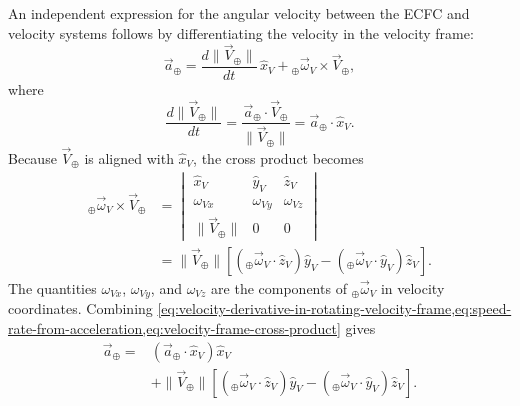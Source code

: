 An independent expression for the angular velocity between the ECFC and velocity
systems follows by differentiating the velocity in the velocity frame:
\begin{equation}
  \vec a_{\oplus}
  =\frac{d\lVert\vec V_{\oplus}\rVert}{dt}\,\hat x_V
   +{}_{\oplus}\vec\omega_V\times\vec V_{\oplus},
  \label{eq:velocity-derivative-in-rotating-velocity-frame}
\end{equation}
where
\begin{equation}
  \frac{d\lVert\vec V_{\oplus}\rVert}{dt}
  =\frac{\vec a_{\oplus}\mathbin{\cdot}\vec V_{\oplus}}
         {\lVert\vec V_{\oplus}\rVert}
  =\vec a_{\oplus}\mathbin{\cdot}\hat x_V.
  \label{eq:speed-rate-from-acceleration}
\end{equation}
Because $\vec V_{\oplus}$ is aligned with $\hat x_V$, the cross product becomes
\begin{equation}
  \begin{aligned}
  {}_{\oplus}\vec\omega_V\times\vec V_{\oplus}
  &=\begin{vmatrix}
    \hat x_V&\hat y_V&\hat z_V\\
    \omega_{Vx}&\omega_{Vy}&\omega_{Vz}\\
    \lVert\vec V_{\oplus}\rVert&0&0
  \end{vmatrix}\\
  &=\lVert\vec V_{\oplus}\rVert
    \left[
      \left({}_{\oplus}\vec\omega_V\mathbin{\cdot}\hat z_V\right)\hat y_V
      -\left({}_{\oplus}\vec\omega_V\mathbin{\cdot}\hat y_V\right)\hat z_V
    \right].
  \end{aligned}
  \label{eq:velocity-frame-cross-product}
\end{equation}
The quantities $\omega_{Vx}$, $\omega_{Vy}$, and $\omega_{Vz}$ are the components
of ${}_{\oplus}\vec\omega_V$ in velocity coordinates. Combining
\cref{eq:velocity-derivative-in-rotating-velocity-frame,eq:speed-rate-from-acceleration,eq:velocity-frame-cross-product}
gives
\begin{equation}
  \begin{aligned}
  \vec a_{\oplus}={}&
  \left(\vec a_{\oplus}\mathbin{\cdot}\hat x_V\right)\hat x_V\\
  &+\lVert\vec V_{\oplus}\rVert
    \left[
      \left({}_{\oplus}\vec\omega_V\mathbin{\cdot}\hat z_V\right)\hat y_V
      -\left({}_{\oplus}\vec\omega_V\mathbin{\cdot}\hat y_V\right)\hat z_V
    \right].
  \end{aligned}
  \label{eq:acceleration-in-velocity-frame}
\end{equation}

